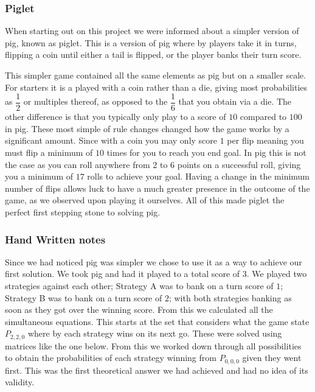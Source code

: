 \documentclass[a4paper,titlepage]{article}
\begin{document}

\subsubsection{Piglet}
When starting out on this project we were informed about a simpler version of pig, known as piglet. This is a version of pig
where by players take it in turns, flipping a coin until either a tail is flipped, or the player banks their turn score.

This simpler game contained all the same elements as pig but on a smaller scale. For starters it is a played with a coin rather than a die,
giving most probabilities as $\dfrac{1}{2}$ or multiples thereof, as opposed to the $\dfrac{1}{6}$ that you obtain via a die.
The other difference is that you typically only play to a score of $10$ compared to $100$ in pig.
These most simple of rule changes changed how the game works by a significant amount. %
Since with a coin you may only score $1$ per flip meaning you must flip a minimum of $10$ times for you to reach you end goal. In pig this is not the case as you can roll anywhere from $2$ to $6$ points on a successful roll, giving you a minimum of $17$ rolls to achieve your goal. Having a change in the minimum number of flips allows luck to have a much greater presence in the outcome of the game, as we observed upon playing it ourselves. All of this made piglet the perfect first stepping stone to solving pig.

\subsubsection{Hand Written notes}
Since we had noticed pig was simpler we chose to use it as a way to achieve our first solution. We took pig and had it played to a total score of $3$. We played two strategies against each other; Strategy A was to bank on a turn score of $1$; Strategy B was to bank on a turn score of $2$; with both strategies banking as soon as they got over the winning score. From this we calculated all the simultaneous equations. This starts at the set that considers what the game state $P_{2,2,0}$ where by each strategy wins on its next go. These were solved using matrices like the one below.
From this we worked down through all possibilities to obtain the probabilities of each strategy winning from $P_{0,0,0}$ given they went first. This was the first theoretical answer we had achieved and had no idea of its validity.
\end{document}
